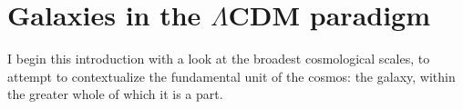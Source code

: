 \section{Galaxies in the \texorpdfstring{$\Lambda$CDM}{LambdaCDM} paradigm}

I begin this introduction with a look at the broadest cosmological scales, to attempt to contextualize the fundamental unit of the cosmos: the galaxy, within the greater whole of which it is a part.